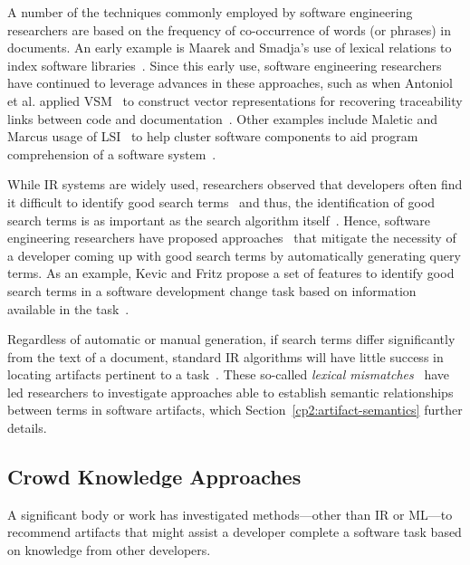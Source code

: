 A number of the techniques commonly employed by software engineering researchers are based on the
frequency of co-occurrence of words (or phrases) in documents.
An early example is Maarek and Smadja's use of lexical relations to index
software libraries~\cite{maarek1989}.
Since this early use, software engineering
researchers have continued to leverage advances in
these approaches, such as when
Antoniol et al. applied \acf{VSM}~\cite{Salton1975vsm} 
to construct vector representations 
for recovering traceability links 
between code and documentation~\cite{antoniol1999, antoniol2000}.
Other examples include Maletic and Marcus usage of \acf{LSI}~\cite{deerwester1990LSI}
to help cluster software components to aid
program comprehension of a software system~\cite{Marcus2003}.



While IR systems are widely used, researchers 
observed that developers often find it difficult to identify good search terms~\cite{Kevic2014, Huang2018}
and thus, the identification of good search terms is as 
important as the search algorithm itself~\cite{Kevic2014, mills2017}.
Hence, software engineering researchers have proposed approaches~\cite{Kevic2014, Haiduc2013}
that mitigate the necessity of a developer coming up with good search terms
by automatically generating query terms.
As an example, Kevic and Fritz propose a set of features to identify good search terms in 
a software development change task based on information available in the task~\cite{Kevic2014}.



Regardless of automatic or manual generation, if search terms 
differ significantly from the text of a document,
standard \acs{IR} algorithms will have 
little success in locating artifacts pertinent to a task~\cite{Huang2018}.
These so-called \textit{lexical mismatches}~\cite{Ye2016, silva2019} have led researchers to investigate 
 approaches able to establish semantic relationships between terms in software artifacts,
 which  Section~\ref{cp2:artifact-semantics} further details.







\subsection{Crowd Knowledge Approaches} 

A significant body or work has investigated 
methods---other than IR or ML---to
recommend artifacts that might assist a developer complete a software task
based on knowledge from other developers.






